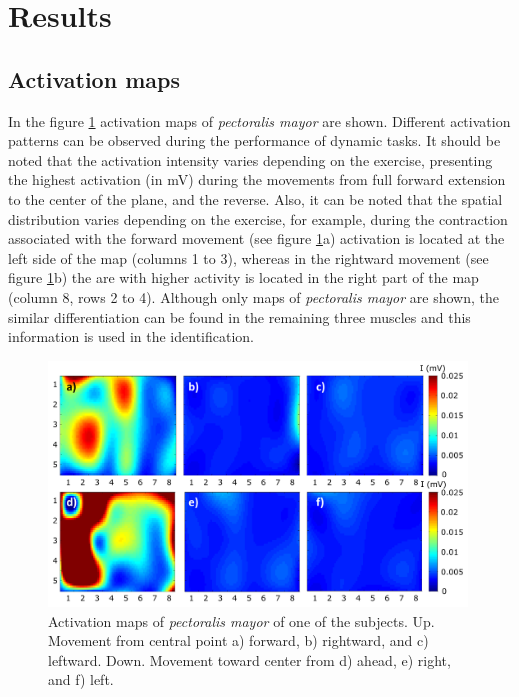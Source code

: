 \section{Results}

\subsection{Activation maps}
In the figure \ref{fig:4-2} activation maps of \textit{pectoralis mayor} are shown. Different activation patterns can be observed during the performance of dynamic tasks. It should be noted that the activation intensity varies depending on the exercise, presenting the highest activation (in mV) during the movements from full forward extension to the center of the plane, and the reverse. Also, it can be noted that the spatial distribution varies depending on the exercise, for example, during the contraction associated with the forward movement (see figure \ref{fig:4-2}a) activation is located at the left side of the map (columns 1 to 3), whereas in the rightward movement (see figure \ref{fig:4-2}b) the are with higher activity is located in the right part of the map (column 8, rows 2 to 4). Although only maps of \textit{pectoralis mayor} are shown, the similar differentiation can be found in the remaining three muscles and this information is used in the identification. 

\begin{figure}[ht]
\centering
\includegraphics[width=0.99\textwidth]{Images/figure4_2.png}
\caption{Activation maps of \textit{pectoralis mayor} of one of the subjects. Up. Movement from central point a) forward, b) rightward, and c) leftward. Down. Movement toward center from  d) ahead, e) right, and f) left.}
\label{fig:4-2}
\end{figure}


